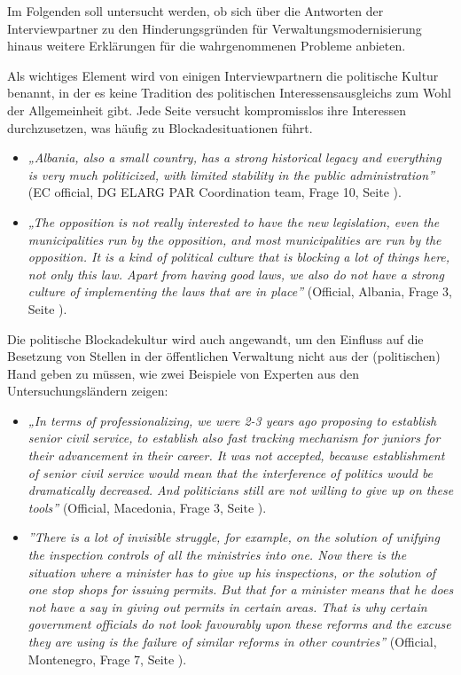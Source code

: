 Im Folgenden soll untersucht werden, ob sich über die Antworten der Interviewpartner zu den Hinderungsgründen für Verwaltungsmodernisierung hinaus weitere Erklärungen für die wahrgenommenen Probleme anbieten.\par
Als wichtiges Element wird von einigen Interviewpartnern die politische Kultur benannt, in der es keine Tradition des politischen Interessensausgleichs zum Wohl der Allgemeinheit gibt. Jede Seite versucht kompromisslos ihre Interessen durchzusetzen, was häufig zu Blockadesituationen führt.
\begin{itemize}[label={}]
\item \textit{„Albania, also a small country, has a strong historical legacy and everything is very much politicized, with limited stability in the public administration”} (EC official, DG ELARG PAR Coordination team, Frage 10, Seite \pageref{sec:montenegro2}).
\item \textit{„The opposition is not really interested to have the new legislation, even the municipalities run by the opposition, and most municipalities are run by the opposition. It is a kind of political culture that is blocking a lot of things here, not only this law. Apart from having good laws, we also do not have a strong culture of implementing the laws that are in place”} (Official, Albania, Frage 3, Seite \pageref{sec:par montenegro}).
\end{itemize}
Die politische Blockadekultur wird auch angewandt, um den Einfluss auf die Besetzung von Stellen in der öffentlichen Verwaltung nicht aus der (politischen) Hand geben zu müssen, wie zwei Beispiele von Experten aus den Untersuchungsländern zeigen:
\begin{itemize}[label={}]
\item \textit{„In terms of professionalizing, we were 2-3 years ago proposing to establish senior civil service, to establish also fast tracking mechanism for juniors for their advancement in their career. It was not accepted, because establishment of senior civil service would mean that the interference of politics would be dramatically decreased. And politicians still are not willing to give up on these tools”} (Official, Macedonia, Frage 3, Seite \pageref{sec:par montenegro}).
\item \textit{”There is a lot of invisible struggle, for example, on the solution of unifying the inspection controls of all the ministries into one. Now there is the situation where a minister has to give up his inspections, or the solution of one stop shops for issuing permits. But that for a minister means that he does not have a say in giving out permits in certain areas. That is why certain government officials do not look favourably upon these reforms and the excuse they are using is the failure of similar reforms in other countries”} (Official, Montenegro, Frage 7, Seite \pageref{sec:par examples}).
\end{itemize}
